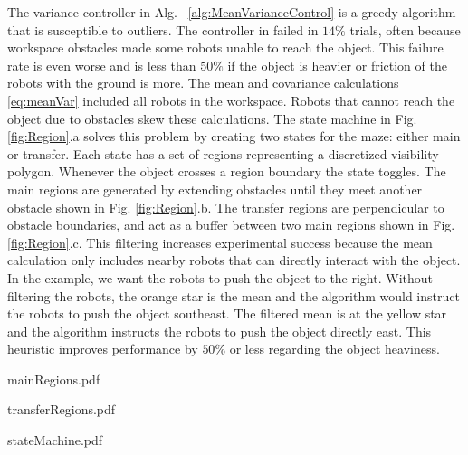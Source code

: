 The variance controller in Alg. ~\ref{alg:MeanVarianceControl} is a greedy algorithm that is susceptible to outliers. The controller in \cite{Shahrokhi2015} failed in $14\%$ trials, often because workspace obstacles made some robots unable to reach the object. This failure rate is even worse and is less than $50\%$ if the object is heavier or friction of the robots with the ground is more. The mean and covariance calculations \eqref{eq:meanVar} included all robots in the workspace. Robots that cannot reach the object due to obstacles skew these calculations. The state machine in Fig. \ref{fig:Region}.a solves this problem by creating two states for the maze: either main or transfer. Each state has a set of regions representing a discretized visibility polygon. Whenever the object crosses a region boundary the state toggles. The main regions are generated by extending obstacles until they meet another obstacle shown in Fig. \ref{fig:Region}.b. The transfer regions are perpendicular to obstacle boundaries, and act as a buffer between two main regions shown in Fig. \ref{fig:Region}.c.
This filtering increases experimental success because the mean calculation only includes nearby robots that can directly interact with the object. In the example, we want the robots to push the object to the right. Without filtering the robots, the orange star is the mean and the algorithm would instruct the robots to push the object southeast. The filtered mean is at the yellow star and the algorithm instructs the robots to push the object directly east. 
This heuristic improves performance by $50\%$ or less regarding the object heaviness.
\begin{figure*}
\begin{center}
	\begin{overpic}[width=0.45\columnwidth]{mainRegions.pdf}\end{overpic}
	\begin{overpic}[width=0.45\columnwidth]{transferRegions.pdf}\end{overpic}
	\begin{overpic}[width=0.45\columnwidth]{stateMachine.pdf}\end{overpic}
\end{center}
\caption{\label{fig:Region} The state machine and regions.
}
\end{figure*}

